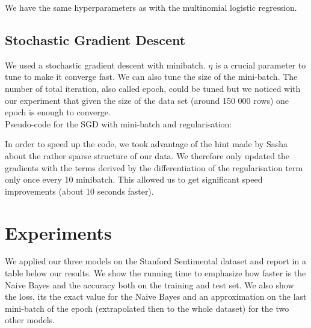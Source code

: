 \documentclass[11pt]{article}
\begin{document}
\noindent We have the same hyperparameters as with the multinomial logistic regression.

\subsection{Stochastic Gradient Descent}

We used a stochastic gradient descent \citep{bottou2012stochastic} with minibatch. $\eta$ is a crucial parameter to tune to make it converge fast. We can also tune the size of the mini-batch. The number of total iteration, also called epoch, could be tuned but we noticed with our experiment that given the size of the data set (around 150 000 rows) one epoch is enough to converge.\\


Pseudo-code for the SGD with mini-batch and regularisation:

  \begin{algorithmic}[1]
    \EndFor{}
    \EndFor{}
    \State{\Return{$\theta$}}
  \end{algorithmic}
  

\noindent In order to speed up the code, we took advantage of the hint made by Sasha about the rather sparse structure of our data. We therefore only updated the gradients with the terms derived by the differentiation of the regularisation term only once every 10 minibatch. This allowed us to get significant speed improvements (about 10 seconds faster).

\section{Experiments}

We applied our three models on the Stanford Sentimental dataset and report in a table below our results. We show the running time to emphasize how faster is the Naive Bayes and the accuracy both on the training and test set. We also show the loss, its the exact value for the Naive Bayes and an approximation on the last mini-batch of the epoch (extrapolated then to the whole dataset) for the two other models.\\
\end{document}
